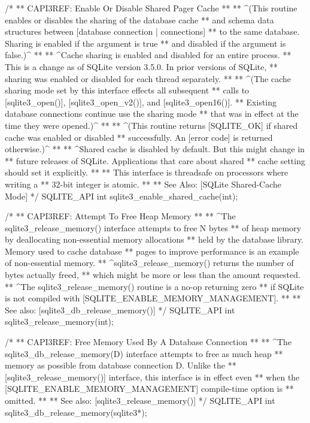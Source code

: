 \begin{Codex}[label=sqlite3.h,numbers=left]
{/*
** CAPI3REF: Enable Or Disable Shared Pager Cache
**
** ^(This routine enables or disables the sharing of the database cache
** and schema data structures between [database connection | connections]
** to the same database. Sharing is enabled if the argument is true
** and disabled if the argument is false.)^
**
** ^Cache sharing is enabled and disabled for an entire process.
** This is a change as of SQLite version 3.5.0. In prior versions of SQLite,
** sharing was enabled or disabled for each thread separately.
**
** ^(The cache sharing mode set by this interface effects all subsequent
** calls to [sqlite3_open()], [sqlite3_open_v2()], and [sqlite3_open16()].
** Existing database connections continue use the sharing mode
** that was in effect at the time they were opened.)^
**
** ^(This routine returns [SQLITE_OK] if shared cache was enabled or disabled
** successfully.  An [error code] is returned otherwise.)^
**
** ^Shared cache is disabled by default. But this might change in
** future releases of SQLite.  Applications that care about shared
** cache setting should set it explicitly.
**
** This interface is threadsafe on processors where writing a
** 32-bit integer is atomic.
**
** See Also:  [SQLite Shared-Cache Mode]
*/
SQLITE_API int sqlite3_enable_shared_cache(int);

/*
** CAPI3REF: Attempt To Free Heap Memory
**
** ^The sqlite3_release_memory() interface attempts to free N bytes
** of heap memory by deallocating non-essential memory allocations
** held by the database library.   Memory used to cache database
** pages to improve performance is an example of non-essential memory.
** ^sqlite3_release_memory() returns the number of bytes actually freed,
** which might be more or less than the amount requested.
** ^The sqlite3_release_memory() routine is a no-op returning zero
** if SQLite is not compiled with [SQLITE_ENABLE_MEMORY_MANAGEMENT].
**
** See also: [sqlite3_db_release_memory()]
*/
SQLITE_API int sqlite3_release_memory(int);

/*
** CAPI3REF: Free Memory Used By A Database Connection
**
** ^The sqlite3_db_release_memory(D) interface attempts to free as much heap
** memory as possible from database connection D. Unlike the
** [sqlite3_release_memory()] interface, this interface is in effect even
** when the [SQLITE_ENABLE_MEMORY_MANAGEMENT] compile-time option is
** omitted.
**
** See also: [sqlite3_release_memory()]
*/
SQLITE_API int sqlite3_db_release_memory(sqlite3*);

}
\end{Codex}
